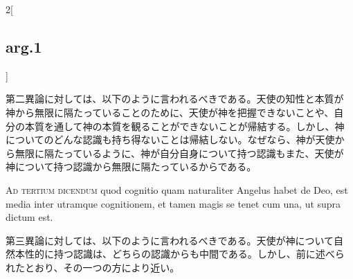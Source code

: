 \documentclass[paper=a4paper,fontsize=10pt,jafontsize=9pt,titlepage]{jlreq}
\begin{document}
\begin{paracol}{2}[\subsection{arg.1}]
\switchcolumn

第二異論に対しては、以下のように言われるべきである。天使の知性と本質が
神から無限に隔たっていることのために、天使が神を把握できないことや、自
分の本質を通して神の本質を観ることができないことが帰結する。しかし、神
についてのどんな認識も持ち得ないことは帰結しない。なぜなら、神が天使か
ら無限に隔たっているように、神が自分自身について持つ認識もまた、天使が
神について持つ認識から無限に隔たっているからである。

\switchcolumn*[\subsection{ad.3}]

{\scshape Ad tertium dicendum} quod cognitio quam naturaliter Angelus
habet de Deo, est media inter utramque cognitionem, et tamen magis se
tenet cum una, ut supra dictum est.

\switchcolumn

第三異論に対しては、以下のように言われるべきである。天使が神について自
然本性的に持つ認識は、どちらの認識からも中間である。しかし、前に述べら
れたとおり、その一つの方により近い。

\end{paracol}
\end{document}
